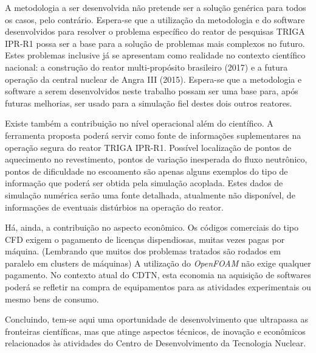 \documentclass[12pt,openright,twoside,a4paper,english,french,spanish,brazil]{abntex2}
\begin{document}
A metodologia a ser desenvolvida não pretende ser a solução genérica para todos os casos, pelo contrário. 
Espera-se que a utilização da metodologia e do software desenvolvidos para resolver o problema específico 
do reator de pesquisas TRIGA IPR-R1 possa ser a base para a solução de problemas mais complexos no futuro. 
Estes problemas inclusive já se apresentam como realidade no contexto científico nacional: a construção do reator multi-propósito brasileiro (2017)
e a futura operação da central nuclear de Angra III (2015). Espera-se que a metodologia e software a serem desenvolvidos neste 
trabalho possam ser uma base para, após futuras melhorias, ser usado para a simulação fiel destes 
dois outros reatores. 

Existe também a contribuição no nível operacional além do científico. A ferramenta proposta poderá servir 
como fonte de informações suplementares na operação segura do reator TRIGA IPR-R1. Possível localização de pontos de aquecimento no 
revestimento, pontos de variação inesperada do fluxo neutrônico, pontos de dificuldade no escoamento são 
apenas alguns exemplos do tipo de informação que poderá ser obtida pela simulação acoplada. Estes dados de
simulação numérica serão uma fonte detalhada, atualmente não disponível, de informações de eventuais distúrbios 
na operação do reator. 

Há, ainda, a contribuição no aspecto econômico. Os códigos comerciais do tipo CFD exigem o pagamento de licenças 
dispendiosas, muitas vezes pagas por máquina. (Lembrando que muitos dos problemas tratados são rodados 
em paralelo em clusters de máquinas) A utilização do \textit{OpenFOAM} não exige qualquer pagamento. No contexto 
atual do CDTN, esta economia na aquisição de softwares poderá se refletir na compra de equipamentos para as atividades experimentais ou 
mesmo bens de consumo.

Concluindo, tem-se aqui uma oportunidade de desenvolvimento que ultrapassa as fronteiras científicas, mas que atinge 
aspectos técnicos, de inovação e econômicos relacionados às atividades do Centro de Desenvolvimento 
da Tecnologia Nuclear.

\end{document}
